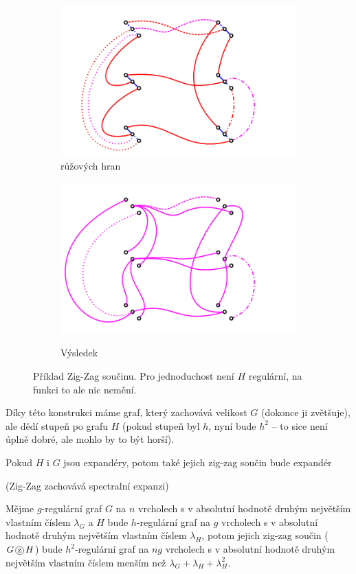 \begin{figure}
\begin{subfigure}{7.5cm}{\includegraphics[width=\textwidth]{img/zigzag3.png}}
{růžových hran}\end{subfigure}
\begin{subfigure}{7.5cm}{\includegraphics[width=\textwidth]{img/zigzag4.png}}\caption{Výsledek}\end{subfigure}
\caption{Příklad Zig-Zag součinu. Pro jednoduchost není $H$ regulární, na funkci
to ale nic nemění.}
\label{zigzag-konstrukce}
\end{figure}

\poz Díky této konstrukci máme graf, který zachovává velikost $G$ (dokonce ji 
zvětšuje), ale dědí stupeň po grafu $H$ (pokud stupeň byl $h$, nyní bude $h^2$ 
-- to sice není úplně dobré, ale mohlo by to být horší).


Pokud $H$ i $G$ jsou  expandéry, potom také jejich zig-zag součin bude  expandér

\vt (Zig-Zag zachovává spectralní expanzi) 

Mějme $g$-regulární graf $G$ na $n$ vrcholech s v absolutní hodnotě druhým největším vlastním číslem $\lambda_G$ a $H$ bude $h$-regulární graf na $g$ vrcholech s v absolutní hodnotě druhým největším vlastním číslem $\lambda_H$, potom jejich zig-zag součin ($G\zz H$) bude $h^2$-regulární graf na $ng$ vrcholech s v absolutní hodnotě druhým největším vlastním číslem menším než $\lambda_G+\lambda_H+\lambda_H^2$.


